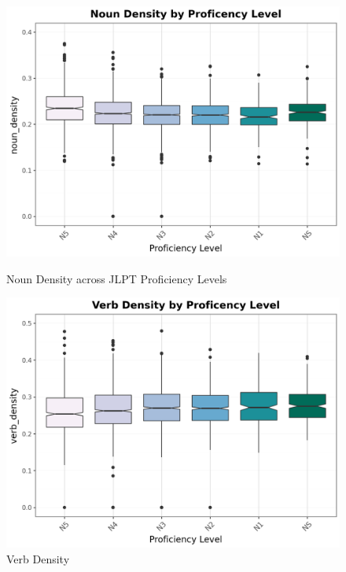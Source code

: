 \begin{figure}[htbp]
    \centering
    \begin{minipage}{.48\textwidth}
        \centering
    \includegraphics[scale=.4]{img/NounDen}
    \caption[Noun Density Across JLPT Proficiency Levels]{Noun Density across JLPT Proficiency Levels}
        \label{fig:nounDen}
    \end{minipage}
    \hfill
\begin{minipage}{.48\textwidth}
        \centering
        \includegraphics[scale=.4]{img/VerbDen}
        \caption[Verb Density Across JLPT Proficiency Levels]{Verb Density}
\label{fig:verbDen}
\end{minipage}
    \end{figure}


